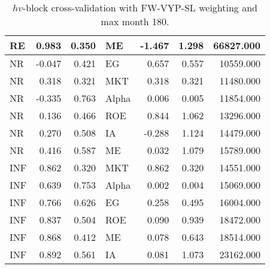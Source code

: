 \documentclass[12pt]{article}
\begin{document}
\begin{table}[ht]
\begin{tabular}{lrrlrrr}
RE & 0.983 & 0.350 & ME & -1.467 & 1.298 & 66827.000 \\ 
\hline
NR & -0.047 & 0.421 & EG & 0.657 & 0.557 & 10559.000 \\ 
NR & 0.318 & 0.321 & MKT & 0.318 & 0.321 & 11480.000 \\ 
NR & -0.335 & 0.763 & Alpha & 0.006 & 0.005 & 11854.000 \\ 
NR & 0.136 & 0.466 & ROE & 0.844 & 1.062 & 13296.000 \\ 
NR & 0.270 & 0.508 & IA & -0.288 & 1.124 & 14479.000 \\ 
NR & 0.416 & 0.587 & ME & 0.032 & 1.079 & 15789.000 \\ 
\hline
INF & 0.862 & 0.320 & MKT & 0.862 & 0.320 & 14551.000 \\ 
INF & 0.639 & 0.753 & Alpha & 0.002 & 0.004 & 15069.000 \\ 
INF & 0.766 & 0.626 & EG & 0.258 & 0.495 & 16004.000 \\ 
INF & 0.837 & 0.504 & ROE & 0.090 & 0.939 & 18472.000 \\ 
INF & 0.868 & 0.412 & ME & 0.078 & 0.643 & 18514.000 \\ 
INF & 0.892 & 0.561 & IA & 0.081 & 1.073 & 23162.000 \\ 
		\hline
		\hline
	\end{tabular}
	\caption{$hv$-block cross-validation with FW-VYP-SL weighting and max month 180.} 
	\label{tab:cv_180_FW_VYP_SL}
\end{table}
\end{document}
